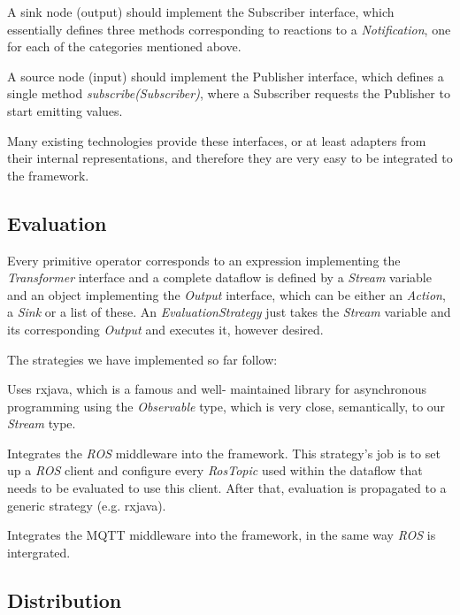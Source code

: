 \documentclass[sigplan,review,anonymous]{acmart}
\begin{document}
A sink node (output) should implement the Subscriber interface, which
essentially defines three methods corresponding to reactions to a
\textit{Notification}, one for each of the categories mentioned above.

A source node (input) should implement the Publisher interface, which defines a
single method \textit{subscribe(Subscriber)}, where a Subscriber requests the
Publisher to start emitting values.

Many existing technologies provide these interfaces, or at least adapters from
their internal representations, and therefore they are very easy to be
integrated to the framework.

\subsection{Evaluation}

Every primitive operator corresponds to an expression implementing the
\textit{Transformer} interface and a complete dataflow is defined by a
\textit{Stream} variable and an object implementing the \textit{Output} interface,
which can be either an \textit{Action}, a \textit{Sink} or a list of these.
An \textit{EvaluationStrategy} just takes the \textit{Stream} variable and its
corresponding \textit{Output} and executes it, however desired.

The strategies we have implemented so far follow:
\begin{description}[style=nextline]
\item[RxJavaEvaluationStrategy] Uses
rxjava, which is a famous and well-
maintained library for asynchronous programming using the \textit{Observable}
type, which is very close, semantically, to our \textit{Stream} type.

\item[RosEvaluationStrategy] Integrates the \textit{ROS} middleware into the
framework. This strategy's job is to set up a \textit{ROS} client and configure every
\textit{RosTopic} used within the dataflow that needs to be evaluated to use
this client. After that, evaluation is propagated to a generic strategy (e.g.
rxjava).

\item[MqttEvaluationStrategy] Integrates the MQTT middleware into the framework,
in the same way \textit{ROS} is intergrated. \end{description}

\subsection{Distribution}
\end{document}

